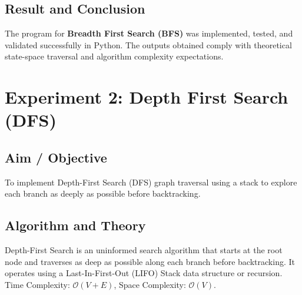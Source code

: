 \documentclass[11pt,a4paper]{report}
\begin{document}
\section{Result and Conclusion}
The program for \textbf{Breadth First Search (BFS)} was implemented, tested, and validated successfully in Python. The outputs obtained comply with theoretical state-space traversal and algorithm complexity expectations.

\newpage

\chapter{Experiment 2: Depth First Search (DFS)}

\section{Aim / Objective}
To implement Depth-First Search (DFS) graph traversal using a stack to explore each branch as deeply as possible before backtracking.

\section{Algorithm and Theory}
Depth-First Search is an uninformed search algorithm that starts at the root node and traverses as deep as possible along each branch before backtracking. It operates using a Last-In-First-Out (LIFO) Stack data structure or recursion. Time Complexity: $\mathcal{O}(V + E)$, Space Complexity: $\mathcal{O}(V)$.
\end{document}
